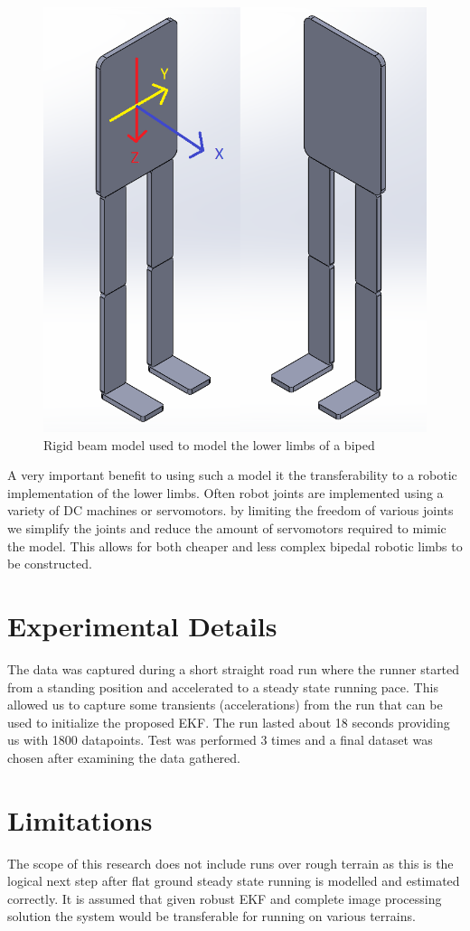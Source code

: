 \begin{figure}[!ht] 
\captionsetup{width=0.8\linewidth, font=small}  
\includegraphics[width=0.8\linewidth]{figures/swmodel.png}
\caption{Rigid beam model used to model the lower limbs of a biped}
\label{fig:swmodel}
\end{figure}

A very important benefit to using such a model it the transferability to a robotic implementation of the lower limbs. Often robot joints are implemented using a variety of DC machines or servomotors. by limiting the freedom of various joints we simplify the joints and reduce the amount of servomotors required to mimic the model. This allows for both cheaper and less complex bipedal robotic limbs to be constructed.

\section{Experimental Details}
The data was captured during a short straight road run where the runner started from a standing position and accelerated to a steady state running pace. This allowed us to capture some transients (accelerations) from the run that can be used to initialize the proposed EKF. The run lasted about 18 seconds providing us with 1800 datapoints. Test was performed 3 times and a final dataset was chosen after examining the data gathered.

\section{Limitations}
The scope of this research does not include runs over rough terrain as this is the logical next step after flat ground steady state running is modelled and estimated correctly. It is assumed that given robust EKF and complete image processing solution the system would be transferable for running on various terrains.

